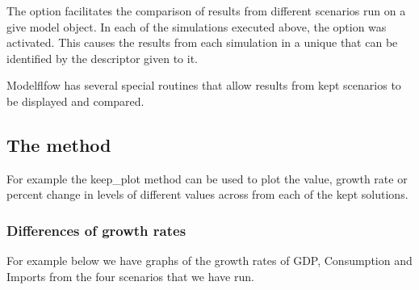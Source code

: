 \documentclass[letterpaper,10pt,english]{jupyterBook}
\begin{document}
\sphinxAtStartPar
The  option facilitates the comparison of results from different scenarios run on a give model object.  In each of the simulations executed above, the  option was activated. This causes the results from each simulation in a unique  that can be identified by the descriptor given to it.

\sphinxAtStartPar
Modelflfow has several special routines that allow results from kept scenarios to be displayed and compared.


\subsection{The  method}
\label{\detokenize{content/06_WBModels/ScenarioAnalysis:the-keep-plot-method}}
\sphinxAtStartPar
For example the keep\_plot method can be used to plot the value, growth rate or percent change in levels of different values across from each of the kept solutions.


\subsubsection{Differences of growth rates}
\label{\detokenize{content/06_WBModels/ScenarioAnalysis:differences-of-growth-rates}}
\sphinxAtStartPar
For example below we have graphs of the growth rates of GDP, Consumption and Imports from the four scenarios that we have run.
\end{document}
